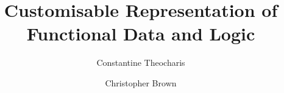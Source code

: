\begin{frontmatter}
  \title{Customisable Representation of Functional Data and Logic}
  \author{Constantine Theocharis}
  \author{Christopher Brown}
  \address{%
    University of St Andrews \\
    St Andrews, Fife, UK
  }


\end{frontmatter}
